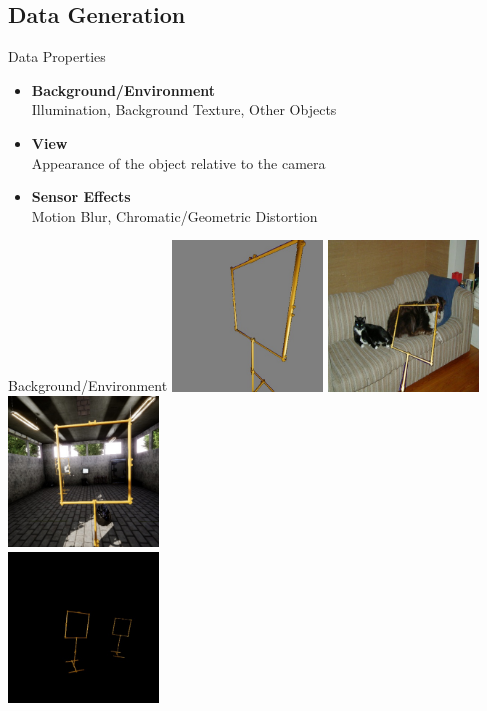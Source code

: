 \documentclass{beamer}
\begin{document}
\begin{darkframes}
  \subsection{Data Generation}
    \begin{frame}{Data Properties}
\begin{itemize}
	\item \textbf{Background/Environment} \\Illumination, Background Texture, Other Objects
	\item \textbf{View} \\Appearance of the object relative to the camera
	\item \textbf{Sensor Effects} \\Motion Blur, Chromatic/Geometric Distortion
\end{itemize}
    \end{frame}
    \begin{frame}{Background/Environment}
    \centering
		\includegraphics[width=0.3\textwidth]{fig/example_uniform}
		\includegraphics[width=0.3\textwidth]{fig/example_real}	\includegraphics[width=0.3\textwidth]{fig/example_virt}\\
		\includegraphics[width=0.3\textwidth]{fig/example_uniform2}

\end{frame}
\end{darkframes}
\end{document}

